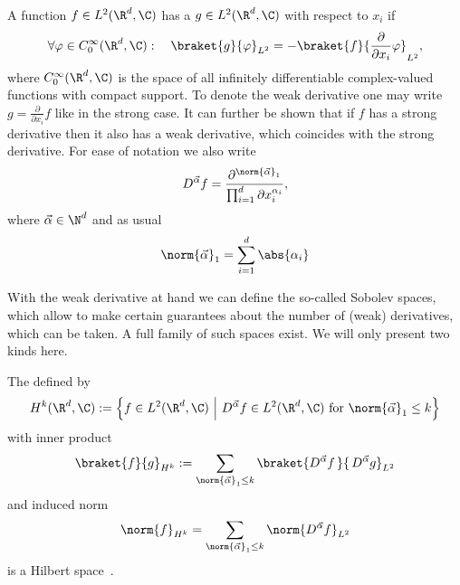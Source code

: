 \begin{defn}
	A function $f \in L^2(\R^d, \C)$ has a 
	$g \in L^2(\R^d, \C)$ with respect to $x_i$ if
	\[ \forall \varphi \in C^\infty_0(\R^d, \C): \quad \braket{g}{\varphi}_{L^2} = - \braket{f}{\frac{\partial}{\partial x_i}\varphi}_{L^2}, \]
	where $C^\infty_0(\R^d, \C)$ is the space of all
	infinitely differentiable complex-valued functions with compact support.
	To denote the weak derivative
	one may write $g = \frac{\partial}{\partial x_i} f$ like in the strong case.
	It can further be shown that if $f$ has a strong derivative
	then it also has a weak derivative, which coincides with the strong derivative.
	For ease of notation we also write
	\[ D^{\vec{\alpha}} f = \frac{\partial^{\norm{\vec{\alpha}}_1}}{ \prod_{i=1}^d \partial x_i^{\alpha_i} }, \]
	where $\vec{\alpha} \in \N^d$ and as usual
	\[ \norm{\vec{\alpha}}_1 = \sum_{i=1}^d \abs{\alpha_i} \]
\end{defn}

\noindent
With the weak derivative at hand we can define the so-called Sobolev spaces,
which allow to make certain guarantees about the number of (weak)
derivatives, which can be taken.
A full family of such spaces exist. We will only present two kinds here.

\begin{defn}
	The  defined by
	\begin{equation}
		H^k(\R^d, \C) := \left\{ f \in L^2(\R^d, \C) ~\middle|~ D^{\vec{\alpha}} f \in L^2(\R^d, \C) \text{ for $\norm{\vec{\alpha}}_1 \le k$} \right\}
		\label{eqn:defSobolev}
	\end{equation}
	with inner product
	\begin{equation}
		\braket{f}{g}_{H^k} := \sum_{\norm{\vec{\alpha}}_1 \le k} \braket{D^{\vec{\alpha}} f\,}{\,D^{\vec{\alpha}} g}_{L^2}
		\label{eqn:defSobolevInnProd}
	\end{equation}
	and induced norm
	\begin{equation}
		\norm{f}_{H^k} = \sum_{\norm{\vec{\alpha}}_1 \le k} \norm{D^{\vec{\alpha}} f}_{L^2}
		\label{eqn:defSobolevNorm}
	\end{equation}
	is a Hilbert space~\cite{Adams2003}.
\end{defn}

